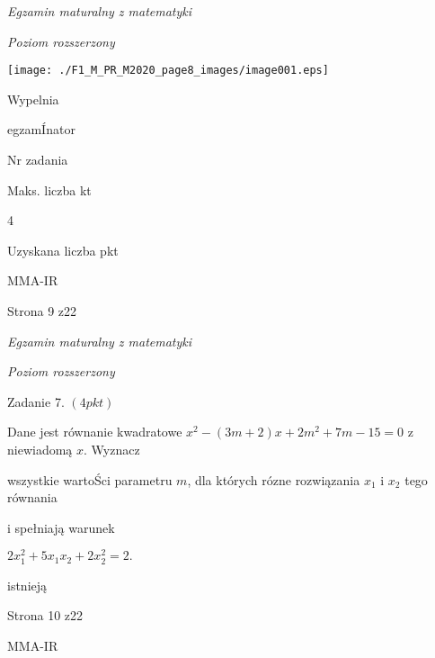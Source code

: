 \documentclass[a4paper,12pt]{article}
\begin{document}
{\it Egzamin maturalny z matematyki}

{\it Poziom rozszerzony}
\begin{center}
\texttt{[image: ./F1\_M\_PR\_M2020\_page8\_images/image001.eps]}
\end{center}
Wypelnia

egzamÍnator

Nr zadania

Maks. liczba kt

4

Uzyskana liczba pkt

MMA-IR

Strona 9 z22





{\it Egzamin maturalny z matematyki}

{\it Poziom rozszerzony}

Zadanie 7. $(4pkt)$

Dane jest równanie kwadratowe $x^{2}-(3m+2)x+2m^{2}+7m-15=0$ z niewiadomą $x$. Wyznacz

wszystkie wartoŚci parametru $m$, dla których rózne rozwiązania $x_{1}$ i $x_{2}$ tego równania

i spełniają warunek

$2x_{1}^{2}+5x_{1}x_{2}+2x_{2}^{2}=2.$

istnieją

Strona 10 z22

MMA-IR
\end{document}
